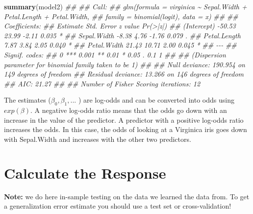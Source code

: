 \documentclass[
  notitlepage]{book}
\newenvironment{Shaded}{\begin{snugshade}}{\end{snugshade}}
\newcommand{\CommentTok}[1]{\textcolor[rgb]{0.56,0.35,0.01}{\textit{#1}}}
\newcommand{\KeywordTok}[1]{\textcolor[rgb]{0.13,0.29,0.53}{\textbf{#1}}}
\newcommand{\NormalTok}[1]{#1}
\begin{document}
\begin{Shaded}
\begin{Highlighting}[]
\KeywordTok{summary}\NormalTok{(model2)}
\CommentTok{\#\# }
\CommentTok{\#\# Call:}
\CommentTok{\#\# glm(formula = virginica \textasciitilde{} Sepal.Width + Petal.Length + Petal.Width, }
\CommentTok{\#\#     family = binomial(logit), data = x)}
\CommentTok{\#\# }
\CommentTok{\#\# Coefficients:}
\CommentTok{\#\#              Estimate Std. Error z value Pr(\textgreater{}|z|)  }
\CommentTok{\#\# (Intercept)    {-}50.53      23.99   {-}2.11    0.035 *}
\CommentTok{\#\# Sepal.Width     {-}8.38       4.76   {-}1.76    0.079 .}
\CommentTok{\#\# Petal.Length     7.87       3.84    2.05    0.040 *}
\CommentTok{\#\# Petal.Width     21.43      10.71    2.00    0.045 *}
\CommentTok{\#\# {-}{-}{-}}
\CommentTok{\#\# Signif. codes:  }
\CommentTok{\#\# 0 \textquotesingle{}***\textquotesingle{} 0.001 \textquotesingle{}**\textquotesingle{} 0.01 \textquotesingle{}*\textquotesingle{} 0.05 \textquotesingle{}.\textquotesingle{} 0.1 \textquotesingle{} \textquotesingle{} 1}
\CommentTok{\#\# }
\CommentTok{\#\# (Dispersion parameter for binomial family taken to be 1)}
\CommentTok{\#\# }
\CommentTok{\#\#     Null deviance: 190.954  on 149  degrees of freedom}
\CommentTok{\#\# Residual deviance:  13.266  on 146  degrees of freedom}
\CommentTok{\#\# AIC: 21.27}
\CommentTok{\#\# }
\CommentTok{\#\# Number of Fisher Scoring iterations: 12}
\end{Highlighting}
\end{Shaded}

The estimates (\(\beta_0, \beta_1,...\) ) are
log-odds and can be converted into odds using \(exp(\beta)\).
A negative log-odds ratio means that the odds go down with an increase in
the value of the predictor. A predictor with a
positive log-odds ratio increases the odds. In this case, the odds of
looking at a Virginica iris goes down with Sepal.Width and increases with the
other two predictors.

\hypertarget{calculate-the-response}{%
\section{Calculate the Response}\label{calculate-the-response}}

\textbf{Note:} we do here in-sample testing on the data we learned the data
from. To get a generalization error estimate you should use a test set or
cross-validation!
\end{document}
